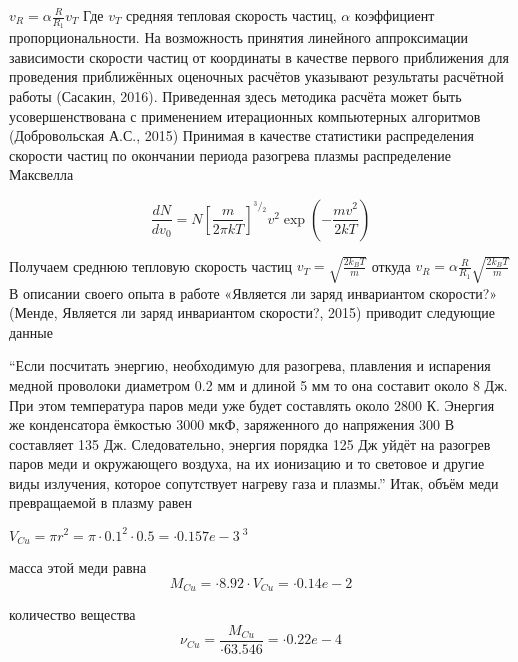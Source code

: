﻿\documentclass{article}
\begin{document}
	${{v}_{R}}=\alpha \frac{R}{{{R}_{1}}}{{v}_{T}}$ 	
Где ${{v}_{T}}$ средняя тепловая скорость частиц, $\alpha $ коэффициент пропорциональности.
На возможность принятия линейного аппроксимации зависимости скорости частиц от координаты в качестве первого приближения для проведения приближённых оценочных расчётов указывают результаты расчётной работы (Сасакин, 2016). 
Приведенная здесь методика расчёта может быть усовершенствована с применением итерационных компьютерных алгоритмов (Добровольская А.С., 2015)
Принимая в качестве статистики распределения скорости частиц по окончании периода разогрева плазмы распределение Максвелла 

	\[\frac{dN}{d{{v}_{0}}}=N{{\left[ \frac{m}{2\pi kT} \right]}^{{}^{3}/{}_{2}}}{{v}^{2}}\exp \left( -\frac{m{{v}^{2}}}{2kT} \right)\]


Получаем  среднюю тепловую скорость частиц  ${{v}_{T}}=\sqrt{\frac{2{{k}_{B}}T}{m}}$ откуда
	${{v}_{R}}=\alpha \frac{R}{{{R}_{1}}}\sqrt{\frac{2{{k}_{B}}T}{m}}$ 	
В описании своего опыта в работе «Является ли заряд инвариантом скорости?» (Менде, Является ли заряд инвариантом скорости?, 2015) приводит следующие данные

“Если посчитать энергию, необходимую для разогрева, плавления и испарения медной проволоки диаметром 0.2 мм и длиной 5 мм то она составит около 8 Дж. При этом температура паров меди уже будет составлять около 2800 К. Энергия же конденсатора ёмкостью 3000 мкФ, заряженного до напряжения 300 В составляет 135 Дж. Следовательно, энергия порядка 125 Дж уйдёт на разогрев паров меди и окружающего воздуха, на их ионизацию и то световое и другие виды излучения, которое сопутствует нагреву газа и плазмы.”
Итак, объём меди превращаемой в плазму равен

${{V}_{Cu}}=\pi {{r}^{2}}=\pi \cdot {{0.1}^{2}}\cdot{ 0.5}=\cdot{0.157e-3}\ {{}^{3}}$

масса этой меди равна \[{{M}_{Cu}}=\cdot{8.92} \cdot {{V}_{Cu}} = \cdot{0.14e-2} \]

количество вещества \[{{\nu }_{Cu}}=\frac{{{M}_{Cu}}}{\cdot{63.546}} = \cdot{0.22e-4 }\]
\end{document}

